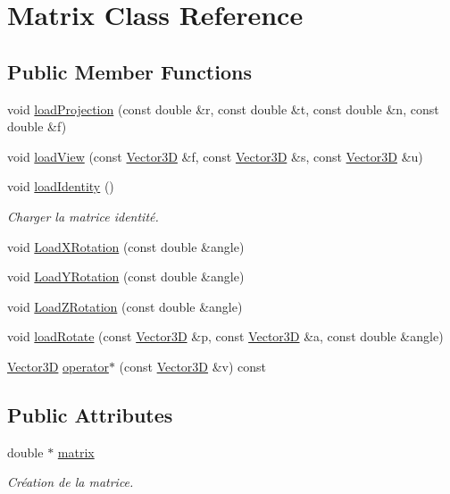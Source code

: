 \hypertarget{class_matrix}{}\section{Matrix Class Reference}
\label{class_matrix}
\subsection*{Public Member Functions}
\begin{DoxyCompactItemize}
\item 
void \hyperlink{class_matrix_ab0334689a1a07e7b73e31e965c838205}{load\+Projection} (const double \&r, const double \&t, const double \&n, const double \&f)
\item 
void \hyperlink{class_matrix_a3243fadb4a01257180fc0eba682d15e6}{load\+View} (const \hyperlink{class_vector3_d}{Vector3\+D} \&f, const \hyperlink{class_vector3_d}{Vector3\+D} \&s, const \hyperlink{class_vector3_d}{Vector3\+D} \&u)
\item 
\hypertarget{class_matrix_a980ae445a0df5fab5b4e68ce83221853}{}void \hyperlink{class_matrix_a980ae445a0df5fab5b4e68ce83221853}{load\+Identity} ()\label{class_matrix_a980ae445a0df5fab5b4e68ce83221853}

\begin{DoxyCompactList}\small\item\em Charger la matrice identité. \end{DoxyCompactList}\item 
void \hyperlink{class_matrix_a50f5775388d269a694d9171cc2428dd7}{Load\+X\+Rotation} (const double \&angle)
\item 
void \hyperlink{class_matrix_aa45dd6685b5fee1398e1a895febec386}{Load\+Y\+Rotation} (const double \&angle)
\item 
void \hyperlink{class_matrix_a755f07dd36da615b173b6b4471bde8c3}{Load\+Z\+Rotation} (const double \&angle)
\item 
void \hyperlink{class_matrix_a9b4b68461e79c87b836d1bfe899ff763}{load\+Rotate} (const \hyperlink{class_vector3_d}{Vector3\+D} \&p, const \hyperlink{class_vector3_d}{Vector3\+D} \&a, const double \&angle)
\item 
\hyperlink{class_vector3_d}{Vector3\+D} \hyperlink{class_matrix_aff7d90c4ef700003076a87230c06a66f}{operator$\ast$} (const \hyperlink{class_vector3_d}{Vector3\+D} \&v) const 
\end{DoxyCompactItemize}
\subsection*{Public Attributes}
\begin{DoxyCompactItemize}
\item 
\hypertarget{class_matrix_aec29b5641994179fae88ea2d464fc45a}{}double $\ast$ \hyperlink{class_matrix_aec29b5641994179fae88ea2d464fc45a}{matrix}\label{class_matrix_aec29b5641994179fae88ea2d464fc45a}

\begin{DoxyCompactList}\small\item\em Création de la matrice. \end{DoxyCompactList}\end{DoxyCompactItemize}


